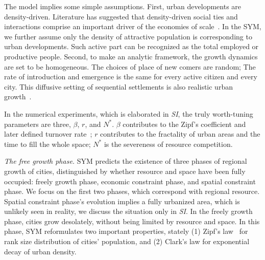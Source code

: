 \documentclass[reprint,unsortedaddress,amsmath,amssymb,aps,prl,showkeys]{revtex4-2}
\begin{document}
The model implies some simple assumptions. First, urban developments are density-driven. Literature has suggested that density-driven social ties and interactions comprise an important driver of the economies of scale~\cite{pan2013urban, girardin2009quantifying, batty1992form}. In the SYM, we further assume only the density of attractive population is corresponding to urban developments. Such active part can be recognized as the total employed or productive people. Second, to make an analytic framework, the growth dynamics are set to be homogeneous. The choices of place of new comers are random; The rate of introduction and emergence is the same for every active citizen and every city. This diffusive setting of sequential settlements is also realistic urban growth~\cite{RevModPhys.87.925}. 

In the numerical experiments, which is elaborated in \textit{SI}, the truly worth-tuning parameters are three, $\beta$, $r$, and $N^*$. $\beta$ contributes to the Zipf's coefficient and later defined turnover rate~\cite{rooney2006structural}; $r$ contributes to the fractality of urban areas and the time to fill the whole space; $N^*$ is the severeness of resource competition. 

\textit{The free growth phase.} SYM predicts the existence of three phases of regional growth of cities, distinguished by whether resource and space have been fully occupied: freely growth phase, economic constraint phase, and spatial constraint phase. We focus on the first two phases, which correspond with regional resource. Spatial constraint phase's evolution implies a fully urbanized area, which is unlikely seen in reality, we discuss the situation only in \textit{SI}. In the freely growth phase, cities grow desolately, without being limited by resource and space. In this phase, SYM reformulates two important properties, stately (1) Zipf's law~\cite{gabaix1999zipf's} for rank size distribution of cities' population, and (2) Clark's law for exponential decay of urban density\cite{clark1951urban}. 
\end{document}
